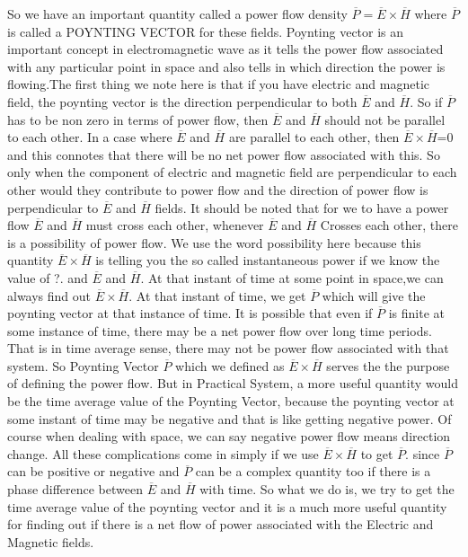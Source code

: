 So we have an important quantity called a power flow density $ \overline{P}=\overline{E}\times\overline{H} $ where $  \overline{P}  $ is called a POYNTING VECTOR for these fields. Poynting vector is an important concept in electromagnetic wave as it tells the power flow associated with any particular point in space and also tells in which direction the power is flowing.The first thing we note here is that if you have electric and magnetic field, the poynting vector is the direction perpendicular to both $ \overline{E} $ and  $ \overline{H} $. So if $  \overline{P}  $  has to be non zero in terms of power flow, then $ \overline{E} $ and  $ \overline{H} $ should not be parallel to each other. In a case where  $ \overline{E} $ and  $ \overline{H} $ are parallel to each other, then  $ \overline{E}\times\overline{H} $=0 and this connotes that there will be no net power flow associated with this. So only when the component of electric and magnetic field  are perpendicular to each other would they contribute to power flow and the direction of power flow is perpendicular to $ \overline{E} $ and  $ \overline{H} $    fields. It should be noted that for we to have a power flow $ \overline{E} $ and  $ \overline{H} $  must cross each other, whenever $ \overline{E} $ and  $ \overline{H} $ Crosses each other, there is a possibility of power flow. We use the word possibility here because this quantity   $ \overline{E}\times\overline{H} $ is telling you the so called instantaneous power if we know the value of ?. and  $ \overline{E} $ and  $ \overline{H} $. At that instant of time at some point in space,we can always find out $ \overline{E}\times\overline{H} $. At that instant of time, we get $  \overline{P}  $ which will give the poynting vector at that instance of time. It is possible that even if $  \overline{P}  $ is finite at some instance of time, there may be  a net power flow over long time periods. That is in time average sense, there may not be power flow associated with that system. So Poynting Vector $  \overline{P}  $ which we defined as $ \overline{E}\times\overline{H} $  serves the the purpose of defining the power flow. But in Practical System, a more useful quantity would be the time average value of the Poynting Vector, because the poynting vector at some instant of time may be negative and that is like getting negative power. Of course when dealing with space, we can say negative power flow means direction change. All these complications come in simply if we use $ \overline{E}\times\overline{H} $ to get  $  \overline{P}  $. since $  \overline{P}  $  can be positive or negative and $  \overline{P}  $  can be a complex quantity too if there is a phase difference between $ \overline{E} $ and  $ \overline{H} $ with time. So what we do is, we try to get the time average value of the poynting vector and it is a much more useful quantity for finding out if there is a net flow of power associated with the Electric and Magnetic fields. \\


